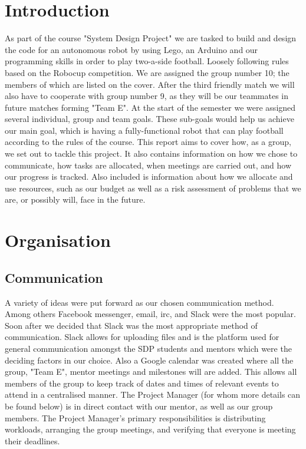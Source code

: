 \documentclass{article}
\begin{document}
\section{Introduction}
As part of the course "System Design Project" we are tasked to build and design
the code for an autonomous robot by using Lego, an Arduino and our programming
skills in order to play two-a-side football. Loosely following rules based on
the Robocup competition. We are assigned the group number 10; the members of
which are listed on the cover. After the third friendly match we will also have
to cooperate with group number 9, as they will be our teammates in future
matches forming "Team E". At the start of the semester we were assigned several
individual, group and team goals. These sub-goals would help us achieve our main
goal, which is having a fully-functional robot that can play football according
to the rules of the course. This report aims to cover how, as a group, we set
out to tackle this project. It also contains information on how we chose to
communicate, how tasks are allocated, when meetings are carried out, and how our
progress is tracked. Also included is information about how we allocate and use
resources, such as our budget as well as a risk assessment of problems that we
are, or possibly will, face in the future.

\section{Organisation}
\subsection{Communication}
A variety of ideas were put forward as our chosen communication method. Among
others Facebook messenger, email, irc, and Slack were the most popular. Soon
after we decided that Slack was the most appropriate method of communication.
Slack allows for uploading files and is the platform used for general
communication amongst the SDP students and mentors which were the deciding
factors in our choice. Also a Google calendar was created where all the group,
"Team E", mentor meetings and milestones will are added. This allows all members
of the group to keep track of dates and times of relevant events to attend in a
centralised manner. The Project Manager (for whom more details can be found
below) is in direct contact with our mentor, as well as our group members. The
Project Manager's primary responsibilities is distributing workloads, arranging
the group meetings, and verifying that everyone is meeting their deadlines.
\end{document}
